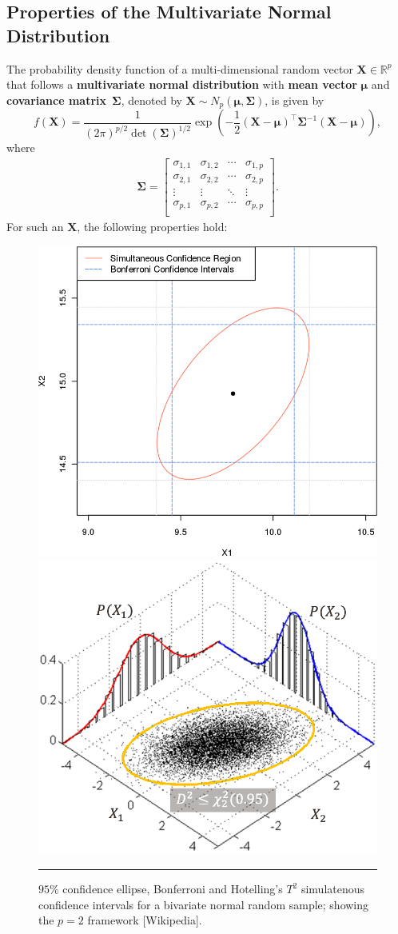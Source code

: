 \subsection{Properties of the Multivariate Normal Distribution}
The probability density function of a multi-dimensional random vector $\mathbf{X}\in\mathbb{R}^p$ that follows a \textbf{multivariate normal distribution} with \textbf{mean vector} $\bm{\mu}$ and \textbf{covariance matrix}~$\bm{\Sigma}$, denoted by $\bm{X}\sim N_p(\bm{\mu},\bm{\Sigma})$, is given by 
\begin{equation*}
f(\bm{X})=\frac{1}{(2\pi)^{p/2}\det(\bm{\Sigma})^{1/2}}\exp\left(-\frac{1}{2}(\bm{X}-\bm{\mu})^{\!\top}\bm{\Sigma}^{-1}(\bm{X}-\bm{\mu})\right),
\end{equation*}
where
\begin{gather*}
    \bm{\Sigma}=
    \begin{bmatrix}
    \sigma_{1,1} & \sigma_{1,2} & \cdots & \sigma_{1,p}\\
    \sigma_{2,1} & \sigma_{2,2} & \cdots & \sigma_{2,p}\\
    \vdots & \vdots &  \ddots & \vdots\\
    \sigma_{p,1} & \sigma_{p,2} & \cdots & \sigma_{p,p}\\
    \end{bmatrix}.  
\end{gather*}
For such an $\bm{X}$, the following properties hold: \begin{figure}[t]
\centering
   \includegraphics[width=0.44\linewidth]{Images/testA7.png}\quad 
   \includegraphics[width=0.48\linewidth]{Images/multivariate.png}

  \caption[\small Confidence regions, Bonferroni and Hotelling simultaneous confidence intervals]{\small $95\%$ confidence ellipse, Bonferroni and Hotelling's ${T}^{2}$ simulatenous confidence intervals for a bivariate normal random sample; showing the  $p=2$ framework [Wikipedia]. }
  \label{fig:testA7}\hrule
\end{figure}
